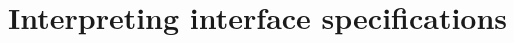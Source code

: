 \documentclass{mtmtcl}
\theoremstyle{plain}
\theoremstyle{remark}
\begin{document}
%     
%     
%     
%     
%     
%     
%     
%     
%     
%     
%     
%     


\section{Interpreting interface specifications}
\end{document}
